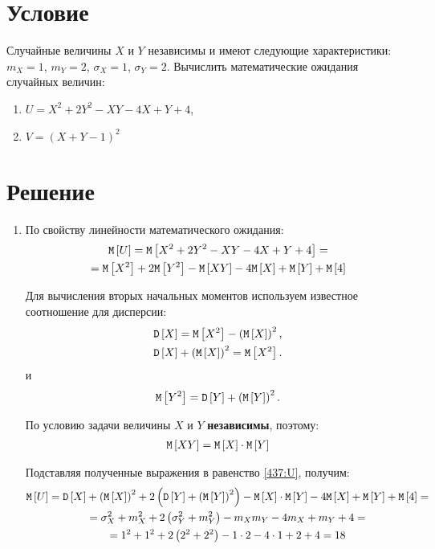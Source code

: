 \section*{Условие}
Случайные величины $X$ и $Y$ независимы и имеют следующие характеристики: $m_X = 1$, $m_Y = 2$, $\sigma_X = 1$, $\sigma_Y = 2$.
Вычислить математические ожидания случайных величин:
\begin{enumerate}
    \item $U = X^2 + 2 Y^2 - XY - 4X + Y + 4$,
    \item $V = (X + Y - 1)^2$
\end{enumerate}
\section*{Решение}
\begin{enumerate}
    \item По свойству линейности математического ожидания:
    \begin{multline}
        \label{437:U}
        \mathtt{M} \left [ U \right ]
        = \mathtt{M} \left [ X^2 + 2 Y^2 - XY - 4X + Y + 4 \right ] = \\
        = \mathtt{M} \left [ X^2 \right ] + 2 \mathtt{M} \left [ Y^2 \right ] - \mathtt{M} \left [ XY \right ] - 4 \mathtt{M} \left [ X \right ] + \mathtt{M} \left [ Y \right ] + \mathtt{M} \left [ 4 \right ]
    \end{multline}

    Для вычисления вторых начальных моментов используем известное соотношение для дисперсии:
    \begin{gather}
        \mathtt{D} \left [ X \right ] = \mathtt{M} \left [ X^2 \right ] - \left ( \mathtt{M} \left [ X \right ] \right )^2 , \\
        \mathtt{D} \left [ X \right ] + \left ( \mathtt{M} \left [ X \right ] \right )^2 = \mathtt{M} \left [ X^2 \right ] \label{437:X_2}.
    \end{gather}
    и
    \begin{equation}
        \label{437:Y_2}
        \mathtt{M} \left [ Y^2 \right ] = \mathtt{D} \left [ Y \right ] + \left ( \mathtt{M} \left [ Y \right ] \right )^2.
    \end{equation}

    По условию задачи величины $X$ и $Y$ \textbf{независимы}, поэтому:
    \begin{gather}
        \mathtt{M} \left [ XY \right ] = \mathtt{M} \left [ X \right ] \cdot \mathtt{M} \left [ Y \right ]
    \end{gather}

    Подставляя полученные выражения в равенство \eqref{437:U}, получим:
    \begin{multline}
        \mathtt{M} \left [ U \right ]
        = \mathtt{D} \left [ X \right ] + \left ( \mathtt{M} \left [ X \right ] \right )^2 + 2 \left ( \mathtt{D} \left [ Y \right ] + \left ( \mathtt{M} \left [ Y \right ] \right )^2 \right ) - \mathtt{M} \left [ X \right ] \cdot \mathtt{M} \left [ Y \right ] - 4 \mathtt{M} \left [ X \right ] + \mathtt{M} \left [ Y \right ] + \mathtt{M} \left [ 4 \right ] = \\
        = \sigma_X^2 + m_X^2 + 2 \left ( \sigma_Y^2 + m_Y^2 \right ) - m_X m_Y - 4 m_X + m_Y + 4 = \\
        = 1^2 + 1^2 + 2 \left ( 2^2 + 2^2 \right ) - 1 \cdot 2 - 4 \cdot 1 + 2 + 4 = 18
    \end{multline}


\end{enumerate}
